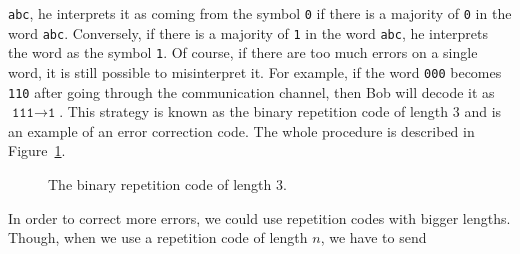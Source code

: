\texttt{abc}, he
interprets it as coming from the symbol \texttt{0} if there is a majority of
\texttt{0} in the word \texttt{abc}. Conversely, if there is a majority of
\texttt{1} in the word \texttt{abc}, he interprets the word as the symbol
\texttt{1}. Of course, if there are too much errors on a single word, it is
still possible to misinterpret it. For example, if the word
\texttt{000} becomes \texttt{110} after going through the communication channel,
then Bob will decode it as $\texttt{111}\to\texttt{1}$. This strategy is known
as the binary repetition code of
length $3$ and is an example of an error correction code. The whole procedure is
described in Figure~\ref{fig:rep3}.
\begin{figure}[h]
  \centering
  \caption{The binary repetition code of length $3$.}
  \label{fig:rep3}
\end{figure}
In order to correct more errors, we could use repetition codes with bigger
lengths. Though, when we use a repetition code of length $n$, we have to send
